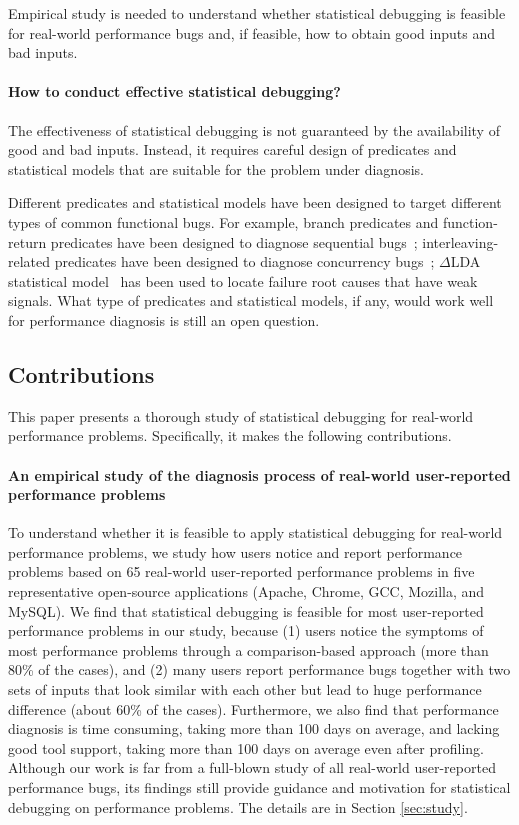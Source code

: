 Empirical study is needed to understand whether statistical debugging is feasible
for real-world performance bugs and, if feasible, how to obtain good inputs and
bad inputs.

\paragraph{How to conduct effective statistical debugging?}
The effectiveness of statistical debugging is not guaranteed by the
availability of good and bad inputs. Instead, it requires careful design
of predicates and statistical models that are suitable for the problem
under diagnosis.

Different predicates and
statistical models have been designed to target different types of common
functional bugs. 
For example, branch predicates and function-return predicates have been
designed to diagnose sequential bugs~\citep{liblit03,liblit05}; 
interleaving-related predicates have been designed to diagnose concurrency bugs~\citep{CCI,joy.asplos13}; 
$\Delta$LDA statistical model~\citep{Delta-LDA} has
been used to locate failure root causes that have weak signals.
What type of predicates and statistical models, if any, would work well
for performance diagnosis is still
an open question.

\subsection{Contributions}
This paper presents a thorough study of statistical debugging for real-world 
performance 
problems. Specifically, it makes the following contributions.

\paragraph{An empirical study of the diagnosis process of real-world 
user-reported performance problems}  
To understand whether it is feasible to apply statistical debugging for
real-world performance problems, we study how users notice and report
performance problems based
on 65 real-world user-reported performance
problems in five representative open-source applications (Apache, Chrome, 
GCC, Mozilla, and MySQL).
We find that statistical debugging is feasible for most
user-reported performance problems in our study, because
(1) users notice the symptoms of most 
performance problems through a comparison-based approach 
(more than 80\% of the cases), and
(2) many users report performance bugs together with two sets of inputs that
look similar with each other but lead to %
huge performance difference
(about 60\% of the cases).
Furthermore, we also find that performance diagnosis is time consuming,
taking more than 100 days on average,
and lacking good tool support, taking more than 100 days on average even after 
profiling. 
Although our work is far from a full-blown study of all real-world
user-reported performance bugs, its
findings still provide guidance and motivation
for statistical debugging on performance problems. The details are 
in Section \ref{sec:study}.

